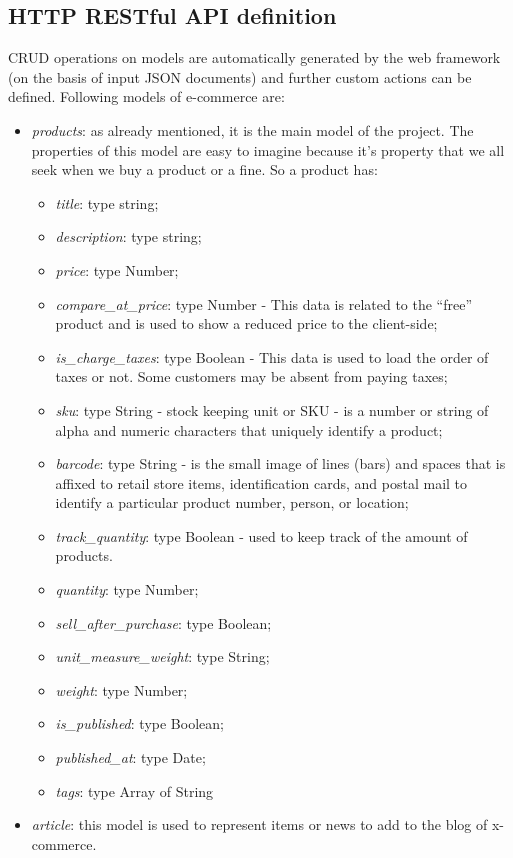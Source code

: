 \subsection{HTTP RESTful API definition}
CRUD operations on models are automatically generated by the web framework (on the basis of input JSON documents) and further custom actions can be defined. Following models of e-commerce are:
\begin{itemize}
\item \emph{products}: as already mentioned, it is the main model of the project. The properties of this model are easy to imagine because it's property that we all seek when we buy a product or a fine. So a product has:
\begin{itemize}
\item \emph{title}: type string;
\item \emph{description}: type string;
\item \emph{price}: type Number;
\item \emph{compare\_at\_price}: type Number - This data is related to the “free” product and is used to show a reduced price to the client-side;
\item \emph{is\_charge\_taxes}: type Boolean - This data is used to load the order of taxes or not. Some customers may be absent from paying taxes;
\item \emph{sku}: type String - stock keeping unit or SKU - is a number or string of alpha and numeric characters that uniquely identify a product;
\item \emph{barcode}: type String - is the small image of lines (bars) and spaces that is affixed to retail store items, identification cards, and postal mail to identify a particular product number, person, or location;
\item \emph{track\_quantity}: type Boolean - used to keep track of the amount of products.
\item \emph{quantity}: type Number;
\item \emph{sell\_after\_purchase}: type Boolean;
\item \emph{unit\_measure\_weight}: type String;
\item \emph{weight}: type Number;
\item \emph{is\_published}: type Boolean;
\item \emph{published\_at}: type Date;
\item \emph{tags}: type Array of String
\end{itemize}
\item \emph{article}: this model is used to represent items or news to add to the blog of x-commerce.

\end{itemize}
